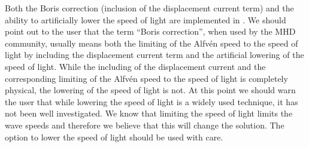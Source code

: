 Both the Boris correction (inclusion of the displacement current term)
and the ability to artificially lower the speed of light are implemented 
in \BATSRUS.  We should point out to the user that the term ``Boris
correction'', when used by the MHD community, usually means both the 
limiting of the Alfv\'en speed to the speed of light by including the
displacement current term and the artificial lowering of the speed of
light.  While the
including of the displacement current and the 
corresponding limiting of the Alfv\'en speed to the speed of light is 
completely physical, the lowering of the speed of light is not.
At this point we should warn the user that while lowering the speed of
light is a widely used
technique, it has not been well investigated.  We know that limiting
the speed of light limits the wave speeds and therefore we believe that this
will change the solution.  The option to lower the speed of light should be used
with care.









